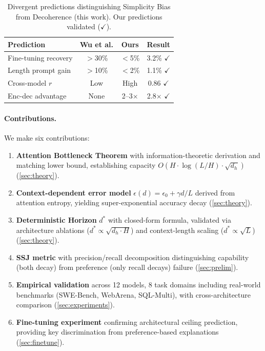 \documentclass{article}
\theoremstyle{plain}
\theoremstyle{definition}
\theoremstyle{remark}
\begin{document}
\begin{table}[t]
\caption{Divergent predictions distinguishing Simplicity Bias \citep{wu2025more} from Decoherence (this work). Our predictions validated ($\checkmark$).}
\label{tab:predictions}
\vskip 0.1in
\centering
\footnotesize
\begin{tabular}{@{}p{2.2cm}ccc@{}}
\toprule
\textbf{Prediction} & \textbf{Wu et al.} & \textbf{Ours} & \textbf{Result} \\
\midrule
Fine-tuning recovery & $>$30\% & $<$5\% & 3.2\% $\checkmark$ \\
Length prompt gain & $>$10\% & $<$2\% & 1.1\% $\checkmark$ \\
Cross-model $r$ & Low & High & 0.86 $\checkmark$ \\
Enc-dec advantage & None & 2--3$\times$ & 2.8$\times$ $\checkmark$ \\
\bottomrule
\end{tabular}
\vskip -0.1in
\end{table}

\paragraph{Contributions.} We make six contributions:
\begin{enumerate}[leftmargin=*,itemsep=1pt]
\item \textbf{Attention Bottleneck Theorem} with information-theoretic derivation and matching lower bound, establishing capacity $O(H \cdot \log(L/H) \cdot \sqrt{d_h})$ (\cref{sec:theory}).
\item \textbf{Context-dependent error model} $\epsilon(d) = \epsilon_0 + \gamma d/L$ derived from attention entropy, yielding super-exponential accuracy decay (\cref{sec:theory}).
\item \textbf{Deterministic Horizon} $d^*$ with closed-form formula, validated via architecture ablations ($d^* \propto \sqrt{d_h \cdot H}$) and context-length scaling ($d^* \propto \sqrt{L}$) (\cref{sec:theory}).
\item \textbf{SSJ metric} with precision/recall decomposition distinguishing capability (both decay) from preference (only recall decays) failure (\cref{sec:prelim}).
\item \textbf{Empirical validation} across 12 models, 8 task domains including real-world benchmarks (SWE-Bench, WebArena, SQL-Multi), with cross-architecture comparison (\cref{sec:experiments}).
\item \textbf{Fine-tuning experiment} confirming architectural ceiling prediction, providing key discrimination from preference-based explanations (\cref{sec:finetune}).
\end{enumerate}
\end{document}
